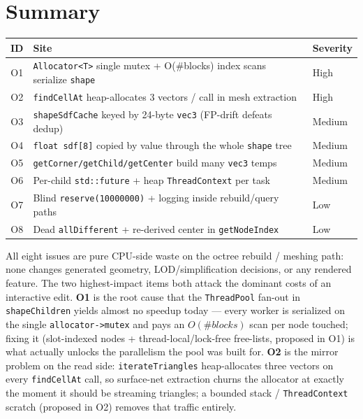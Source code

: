 \documentclass[a4paper,12pt]{article}
\begin{document}
\newpage

\section{Summary}

\begin{center}
\begin{tabular}{cll}
\toprule
\textbf{ID} & \textbf{Site} & \textbf{Severity} \\
\midrule
O1 & \texttt{Allocator<T>} single mutex + O(\#blocks) index scans serialize \texttt{shape} & High   \\
O2 & \texttt{findCellAt} heap-allocates 3 vectors / call in mesh extraction      & High   \\
O3 & \texttt{shapeSdfCache} keyed by 24-byte \texttt{vec3} (FP-drift defeats dedup) & Medium \\
O4 & \texttt{float sdf[8]} copied by value through the whole \texttt{shape} tree & Medium \\
O5 & \texttt{getCorner/getChild/getCenter} build many \texttt{vec3} temps        & Medium \\
O6 & Per-child \texttt{std::future} + heap \texttt{ThreadContext} per task       & Medium \\
O7 & Blind \texttt{reserve(10000000)} + logging inside rebuild/query paths       & Low    \\
O8 & Dead \texttt{allDifferent} + re-derived center in \texttt{getNodeIndex}     & Low    \\
\bottomrule
\end{tabular}
\end{center}

All eight issues are pure CPU-side waste on the octree rebuild / meshing path: none
changes generated geometry, LOD/simplification decisions, or any rendered feature.
The two highest-impact items both attack the dominant costs of an interactive
edit. \textbf{O1} is the root cause that the \texttt{ThreadPool} fan-out in
\texttt{shapeChildren} yields almost no speedup today — every worker is serialized
on the single \texttt{allocator->mutex} and pays an $O(\#blocks)$ scan per node
touched; fixing it (slot-indexed nodes + thread-local/lock-free free-lists,
proposed in O1) is what actually unlocks the parallelism the pool was built for.
\textbf{O2} is the mirror problem on the read side: \texttt{iterateTriangles}
heap-allocates three vectors on every \texttt{findCellAt} call, so surface-net
extraction churns the allocator at exactly the moment it should be streaming
triangles; a bounded stack / \texttt{ThreadContext} scratch (proposed in O2)
removes that traffic entirely.
\end{document}
